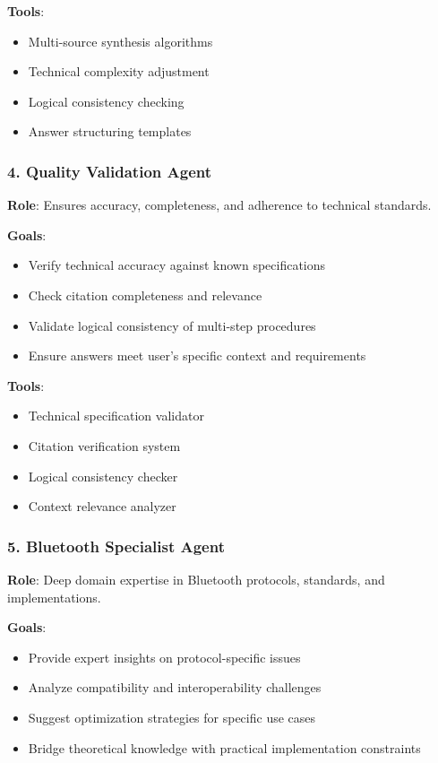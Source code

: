 \documentclass[11pt, a4paper]{article}
\begin{document}
\textbf{Tools}:
\begin{itemize}
    \item Multi-source synthesis algorithms
    \item Technical complexity adjustment
    \item Logical consistency checking
    \item Answer structuring templates
\end{itemize}

\subsubsection{4. Quality Validation Agent}
\textbf{Role}: Ensures accuracy, completeness, and adherence to technical standards.

\textbf{Goals}:
\begin{itemize}
    \item Verify technical accuracy against known specifications
    \item Check citation completeness and relevance
    \item Validate logical consistency of multi-step procedures
    \item Ensure answers meet user's specific context and requirements
\end{itemize}

\textbf{Tools}:
\begin{itemize}
    \item Technical specification validator
    \item Citation verification system
    \item Logical consistency checker
    \item Context relevance analyzer
\end{itemize}

\subsubsection{5. Bluetooth Specialist Agent}
\textbf{Role}: Deep domain expertise in Bluetooth protocols, standards, and implementations.

\textbf{Goals}:
\begin{itemize}
    \item Provide expert insights on protocol-specific issues
    \item Analyze compatibility and interoperability challenges
    \item Suggest optimization strategies for specific use cases
    \item Bridge theoretical knowledge with practical implementation constraints
\end{itemize}
\end{document}
